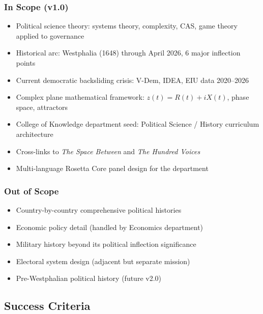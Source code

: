 \documentclass[11pt,letterpaper]{article}
\begin{document}
\subsubsection{In Scope (v1.0)}
\begin{itemize}[noitemsep]
  \item Political science theory: systems theory, complexity, CAS, game theory applied to governance
  \item Historical arc: Westphalia (1648) through April 2026, 6 major inflection points
  \item Current democratic backsliding crisis: V-Dem, IDEA, EIU data 2020--2026
  \item Complex plane mathematical framework: $z(t) = R(t) + iX(t)$, phase space, attractors
  \item College of Knowledge department seed: Political Science / History curriculum architecture
  \item Cross-links to \textit{The Space Between} and \textit{The Hundred Voices}
  \item Multi-language Rosetta Core panel design for the department
\end{itemize}

\subsubsection{Out of Scope}
\begin{itemize}[noitemsep]
  \item Country-by-country comprehensive political histories
  \item Economic policy detail (handled by Economics department)
  \item Military history beyond its political inflection significance
  \item Electoral system design (adjacent but separate mission)
  \item Pre-Westphalian political history (future v2.0)
\end{itemize}

\subsection{Success Criteria}
\end{document}
